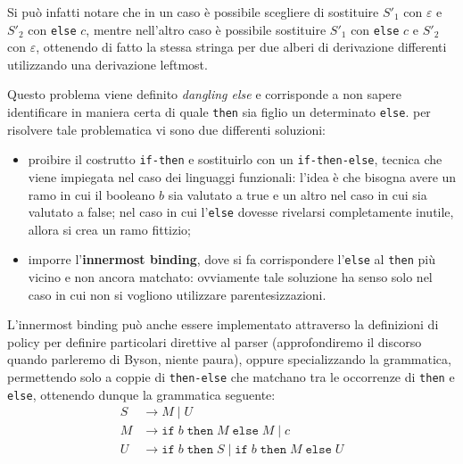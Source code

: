 \documentclass[class=book, crop=false, oneside, 12pt]{standalone}
\begin{document}
Si può infatti notare che in un caso è possibile scegliere di sostituire \({S'}_1\) con \(\varepsilon\) e \({S'}_2\) con \texttt{else} \(c\), mentre nell'altro caso è possibile sostituire \({S'}_1\) con \texttt{else} \(c\) e \({S'}_2\) con \(\varepsilon\), ottenendo di fatto la stessa stringa per due alberi di derivazione differenti utilizzando una derivazione leftmost.

Questo problema viene definito \emph{dangling else} e corrisponde a non sapere identificare in maniera certa di quale \texttt{then} sia figlio un determinato \texttt{else}. per risolvere tale problematica vi sono due differenti soluzioni:
\begin{itemize}
    \item proibire il costrutto \texttt{if-then} e sostituirlo con un \texttt{if-then-else}, tecnica che viene impiegata nel caso dei linguaggi funzionali: l'idea è che bisogna avere un ramo in cui il booleano \(b\) sia valutato a true e un altro nel caso in cui sia valutato a false; nel caso in cui l'\texttt{else} dovesse rivelarsi completamente inutile, allora si crea un ramo fittizio;
    \item imporre l'\textbf{innermost binding}, dove si fa corrispondere l'\texttt{else} al \texttt{then} più vicino e non ancora matchato: ovviamente tale soluzione ha senso solo nel caso in cui non si vogliono utilizzare parentesizzazioni.
\end{itemize}
L'innermost binding può anche essere implementato attraverso la definizioni di policy per definire particolari direttive al parser (approfondiremo il discorso quando parleremo di Byson, niente paura), oppure specializzando la grammatica, permettendo solo a coppie di \texttt{then-else} che matchano tra le occorrenze di \texttt{then} e \texttt{else}, ottenendo dunque la grammatica seguente:
\begin{align*}
    S &\rightarrow M \mid U \\
    M &\rightarrow \texttt{if} \; b \; \texttt{then} \; M \; \texttt{else} \; M \mid c \\
    U &\rightarrow \texttt{if} \; b \; \texttt{then} \; S \mid \texttt{if} \; b \; \texttt{then} \; M \; \texttt{else} \; U
\end{align*}
\end{document}

